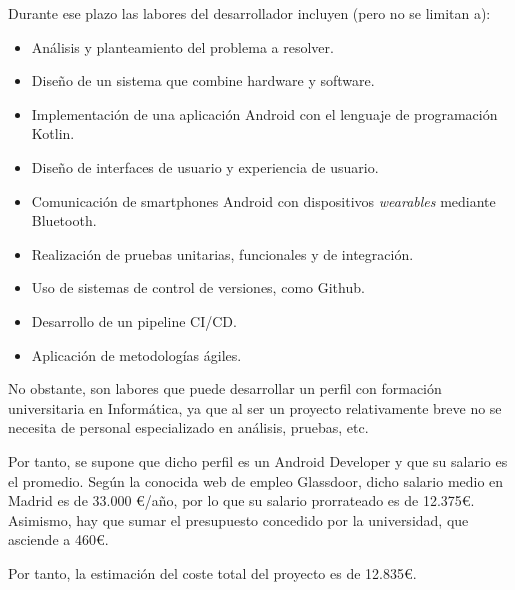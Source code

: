                 Durante ese plazo las labores del desarrollador incluyen (pero no se limitan a):
                \begin{itemize}
                    \item Análisis y planteamiento del problema a resolver.
                    \item Diseño de un sistema que combine hardware y software.
                    \item Implementación de una aplicación Android con el lenguaje de programación Kotlin.
                    \item Diseño de interfaces de usuario y experiencia de usuario. 
                    \item Comunicación de smartphones Android con dispositivos \textit{wearables} mediante Bluetooth.
                    \item Realización de pruebas unitarias, funcionales y de integración.
                    \item Uso de sistemas de control de versiones, como Github.
                    \item Desarrollo de un pipeline CI/CD.
                    \item Aplicación de metodologías ágiles.
                \end{itemize}
                
                No obstante, son labores que puede desarrollar un perfil con formación universitaria en Informática, ya que al ser un proyecto relativamente breve no se necesita de personal especializado en análisis, pruebas, etc. 
                
                Por tanto, se supone que dicho perfil es un Android Developer y que su salario es el promedio. Según la conocida web de empleo Glassdoor, dicho salario medio en Madrid es de 33.000 €/año, por lo que su salario prorrateado es de 12.375€. Asimismo, hay que sumar el presupuesto concedido por la universidad, que asciende a 460€.
                
                Por tanto, la estimación del coste total del proyecto es de 12.835€.

        
            